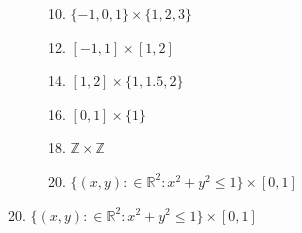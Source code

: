 \documentclass{article}
\begin{document}
\clearpage
\begin{figure}
    \centering
    \begin{subfigure}[b]{0.49\textwidth}
        \centering
        \caption*{10. $\{-1,0,1\} \times \{1,2,3\}$}
        \resizebox{1\linewidth}{!}{}
    \end{subfigure}
    \hfill
    \begin{subfigure}[b]{0.49\textwidth}
        \centering
        \caption*{12. $[-1,1] \times [1,2]$}
        \resizebox{1\linewidth}{!}{}
    \end{subfigure}
    \hfill
    \begin{subfigure}[b]{0.49\textwidth}
        \centering
        \caption*{14. $[1,2] \times \{1,1.5,2\}$}
        \resizebox{1\linewidth}{!}{}
    \end{subfigure}
    \hfill
    \begin{subfigure}[b]{0.49\textwidth}
        \centering
        \caption*{16. $[0,1]\times\{1\}$}
        \resizebox{1\linewidth}{!}{}
    \end{subfigure}
    \hfill
    \begin{subfigure}[b]{0.49\textwidth}
        \centering
        \caption*{18. $\mathbb{Z} \times \mathbb{Z}$}
        \resizebox{1\linewidth}{!}{}
    \end{subfigure}
    \hfill
    \begin{subfigure}[b]{0.49\textwidth}
        \centering
        \caption*{20. $\{(x,y):\in\mathbb{R}^2:x^2+y^2\leq1\}\times [0,1]$}
        \resizebox{1\linewidth}{!}{}
    \end{subfigure}
\end{figure}
\clearpage
\end{document}
